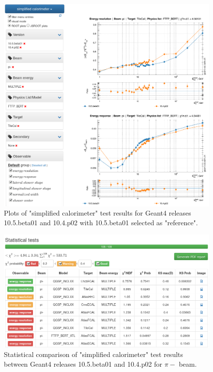 \begin{itemize}
\begin{figure}[h]
    \centering
    \includegraphics[width=\textwidth,clip]{sc_visual_ratio.png}
    \caption{Plots of "simplified calorimeter" test results for Geant4 releases 10.5.beta01 and 10.4.p02 with 10.5.beta01 selected as "reference".}
    \label{fig:sc_visual_ratio}
\end{figure}

\begin{figure}[h]
    \centering
    \includegraphics[width=\textwidth,clip]{statcomparison.png}
    \caption{Statistical comparison of "simplified calorimeter" test results between Geant4 releases 10.5.beta01 and 10.4.p02 for $\pi-$ beam.}
    \label{fig:statcomparison}
\end{figure}




\end{itemize}
